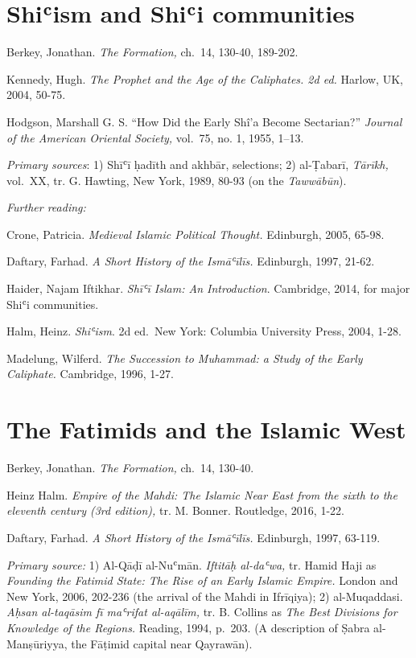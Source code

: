 \documentclass[
]{book}
\begin{document}
\hypertarget{shiux2bfism-and-shiux2bfi-communities}{%
\chapter{Shiʿism and Shiʿi communities}\label{shiux2bfism-and-shiux2bfi-communities}}

Berkey, Jonathan. \emph{The Formation,} ch.~14, 130-40, 189-202.

Kennedy, Hugh. \emph{The Prophet and the Age of the Caliphates. 2d ed.}
Harlow, UK, 2004, 50-75.

Hodgson, Marshall G. S. ``How Did the Early Shî'a Become
Sectarian?'' \emph{Journal of the American Oriental Society,} vol.~75, no. 1, 1955, 1--13.

\emph{Primary sources}: 1) Shīʿī ḥadīth and akhbār, selections; 2)
al-Ṭabarī, \emph{Tārīkh,} vol.~XX, tr. G. Hawting, New York, 1989, 80-93 (on
the \emph{Tawwābūn}).

\emph{Further reading:}

Crone, Patricia. \emph{Medieval Islamic Political Thought.} Edinburgh, 2005,
65-98.

Daftary, Farhad. \emph{A Short History of the Ismāʿīlīs.} Edinburgh, 1997,
21-62.

Haider, Najam Iftikhar. \emph{Shīʿī Islam: An Introduction}. Cambridge, 2014,
for major Shiʿi communities.

Halm, Heinz. \emph{Shiʿism}. 2d ed.~New York: Columbia University Press, 2004, 1-28.

Madelung, Wilferd. \emph{The Succession to Muhammad: a Study of the Early Caliphate.} Cambridge, 1996, 1-27.

\hypertarget{the-fatimids-and-the-islamic-west}{%
\chapter{The Fatimids and the Islamic West}\label{the-fatimids-and-the-islamic-west}}

Berkey, Jonathan. \emph{The Formation,} ch.~14, 130-40.

Heinz Halm. \emph{Empire of the Mahdi: The Islamic Near East from the sixth to the eleventh century (3rd edition),} tr. M. Bonner. Routledge, 2016, 1-22.

Daftary, Farhad. \emph{A Short History of the Ismāʿīlīs.} Edinburgh, 1997, 63-119.

\emph{Primary source:} 1) Al-Qāḍī al-Nuʿmān. \emph{Iftitāḥ al-daʿwa,} tr. Hamid
Haji as \emph{Founding the Fatimid State: The Rise of an Early Islamic
Empire.} London and New York, 2006, 202-236 (the arrival of the Mahdi in
Ifrīqiya); 2) al-Muqaddasi. \emph{Aḥsan al-taqāsim fī maʿrifat al-aqālīm,}
tr. B. Collins as \emph{The Best Divisions for Knowledge of the Regions.}
Reading, 1994, p.~203. (A description of Ṣabra al-Manṣūriyya, the
Fāṭimid capital near Qayrawān).
\end{document}
